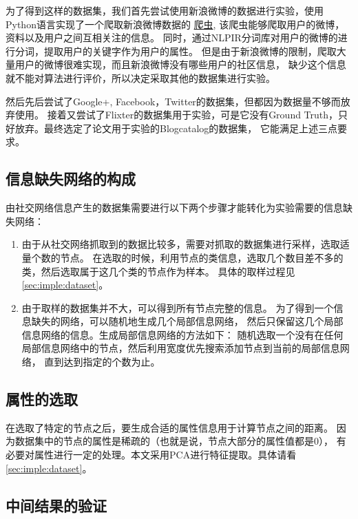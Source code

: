 为了得到这样的数据集，我们首先尝试使用新浪微博的数据进行实验，使用Python语言实现了一个爬取新浪微博数据的
\href{https://github.com/chouqin/weibo-crawler}{爬虫},
该爬虫能够爬取用户的微博，资料以及用户之间互相关注的信息。
同时，通过NLPIR分词库对用户的微博的进行分词，提取用户的关键字作为用户的属性。
但是由于新浪微博的限制，爬取大量用户的微博很难实现，而且新浪微博没有哪些用户的社区信息，
缺少这个信息就不能对算法进行评价，所以决定采取其他的数据集进行实验。

然后先后尝试了Google+, Facebook，Twitter的数据集，但都因为数据量不够而放弃使用。
接着又尝试了Flixter的数据集用于实验，可是它没有Ground Truth，只好放弃。最终选定了论文用于实验的Blogcatalog的数据集，
它能满足上述三点要求。

\subsection{信息缺失网络的构成}

由社交网络信息产生的数据集需要进行以下两个步骤才能转化为实验需要的信息缺失网络：

\begin{enumerate}
\item 由于从社交网络抓取到的数据比较多，需要对抓取的数据集进行采样，选取适量个数的节点。
在选取的时候，利用节点的类信息，选取几个数目差不多的类，然后选取属于这几个类的节点作为样本。
具体的取样过程见\ref{sec:imple:dataset}。
\item 由于取样的数据集并不大，可以得到所有节点完整的信息。
为了得到一个信息缺失的网络，可以随机地生成几个局部信息网络，
然后只保留这几个局部信息网络的信息。生成局部信息网络的方法如下：
随机选取一个没有在任何局部信息网络中的节点，然后利用宽度优先搜索添加节点到当前的局部信息网络，
直到达到指定的个数为止。
\end{enumerate}


\subsection{属性的选取}

在选取了特定的节点之后，要生成合适的属性信息用于计算节点之间的距离。
因为数据集中的节点的属性是稀疏的（也就是说，节点大部分的属性值都是0），
有必要对属性进行一定的处理。本文采用PCA进行特征提取。具体请看\ref{sec:imple:dataset}。

\subsection{中间结果的验证}

